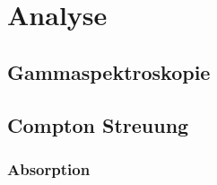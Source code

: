 
\section{Analyse}

\subsection{Gammaspektroskopie}

\subsection{Compton Streuung}

\subsubsection{Absorption}

